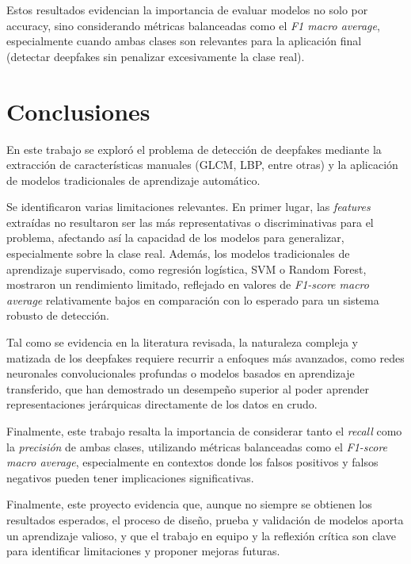 \documentclass[conference]{IEEEtran}
\begin{document}
Estos resultados evidencian la importancia de evaluar modelos no solo por accuracy, sino considerando métricas balanceadas como el \emph{F1 macro average}, especialmente cuando ambas clases son relevantes para la aplicación final (detectar deepfakes sin penalizar excesivamente la clase real). 






\section{Conclusiones}

En este trabajo se exploró el problema de detección de deepfakes mediante la extracción de características manuales (GLCM, LBP, entre otras) y la aplicación de modelos tradicionales de aprendizaje automático. 

Se identificaron varias limitaciones relevantes. En primer lugar, las \emph{features} extraídas no resultaron ser las más representativas o discriminativas para el problema, afectando así la capacidad de los modelos para generalizar, especialmente sobre la clase real. Además, los modelos tradicionales de aprendizaje supervisado, como regresión logística, SVM o Random Forest, mostraron un rendimiento limitado, reflejado en valores de \emph{F1-score macro average} relativamente bajos en comparación con lo esperado para un sistema robusto de detección.

Tal como se evidencia en la literatura revisada, la naturaleza compleja y matizada de los deepfakes requiere recurrir a enfoques más avanzados, como redes neuronales convolucionales profundas o modelos basados en aprendizaje transferido, que han demostrado un desempeño superior al poder aprender representaciones jerárquicas directamente de los datos en crudo. 

Finalmente, este trabajo resalta la importancia de considerar tanto el \emph{recall} como la \emph{precisión} de ambas clases, utilizando métricas balanceadas como el \emph{F1-score macro average}, especialmente en contextos donde los falsos positivos y falsos negativos pueden tener implicaciones significativas.

 Finalmente, este proyecto evidencia que, aunque no siempre se obtienen los resultados esperados, el proceso de diseño, prueba y validación de modelos aporta un aprendizaje valioso, y que el trabajo en equipo y la reflexión crítica son clave para identificar limitaciones y proponer mejoras futuras.


















\end{document}
